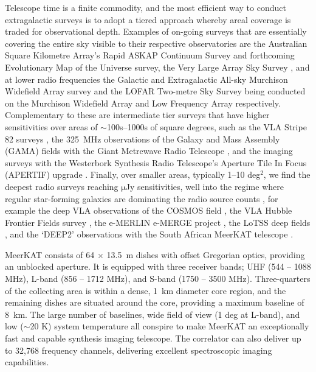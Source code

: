 \documentclass[usenatbib,usedcolumn]{mnras}
\begin{document}
Telescope time is a finite commodity, and the most efficient way to conduct extragalactic surveys is to adopt a tiered approach whereby areal coverage is traded for observational depth. Examples of on-going surveys that are essentially covering the entire sky visible to their respective observatories are the Australian Square Kilometre Array's \citep[ASKAP;][]{hotan2021} Rapid ASKAP Continuum Survey \citep[RACS;][]{mcconnell2020,hale2021} and forthcoming Evolutionary Map of the Universe \citep[EMU;][]{norris2015} survey, the Very Large Array Sky Survey \citep[VLASS;][]{lacy2020}, and at lower radio frequencies the Galactic and Extragalactic All-sky Murchison Widefield Array survey \citep[GLEAM;][]{hurleywalker2017} and the LOFAR Two-metre Sky Survey \citep[LoTSS;][]{shimwell2017} being conducted on the Murchison Widefield Array \citep[MWA;][]{lonsdale2009} and Low Frequency Array \citep[LOFAR;][]{vanhaarlem2013} respectively. Complementary to these are intermediate tier surveys that have higher sensitivities over areas of $\sim$100s--1000s of square degrees, such as the VLA Stripe 82 surveys \citep{heywood2016,mooley2016}, the 325~MHz observations of the Galaxy and Mass Assembly (GAMA) fields with the Giant Metrewave Radio Telescope \citep{mauch2013}, and the imaging surveys with the Westerbork Synthesis Radio Telescope's Aperture Tile In Focus (APERTIF) upgrade \citep{vanCappellen2021}. Finally, over smaller areas, typically 1--10 deg$^{2}$, we find the deepest radio surveys reaching $\mathrm{\mu}$Jy sensitivities, well into the regime where regular star-forming galaxies are dominating the radio source counts \citep[e.g.][]{prandoni2018, matthews2021}, for example the deep VLA observations of the COSMOS field \citep{smolcic2017,vandervlugt2021}, the VLA Hubble Frontier Fields survey \citep{heywood2021}, the e-MERLIN e-MERGE project \citep{muxlow2020}, the LoTSS deep fields \citep{tasse2020}, and the `DEEP2' observations \citep{mauch2020} with the South African MeerKAT telescope \citep{jonas2016}.

 MeerKAT consists of 64 $\times$ 13.5~m dishes with offset Gregorian optics, providing an unblocked aperture. It is equipped with three receiver bands; UHF (544 -- 1088 MHz), L-band (856 -- 1712 MHz), and S-band (1750 -- 3500  MHz). Three-quarters of the collecting area is within a dense, 1~km diameter core region, and the remaining dishes are situated around the core, providing a maximum baseline of 8~km. The large number of baselines, wide field of view (1 deg at L-band), and low ($\sim$20 K) system temperature all conspire to make MeerKAT an exceptionally fast and capable synthesis imaging telescope. The correlator can also deliver up to 32,768 frequency channels, delivering excellent spectroscopic imaging capabilities.
\end{document}
